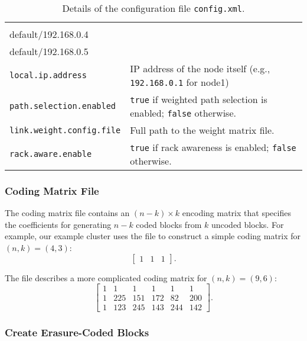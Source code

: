 \documentclass[letterpaper,12pt]{article}
\begin{document}
\begin{table}[!ht]
\begin{tabular}{|p{2in}|p{4.2in}|}
{default/192.168.0.3\\
default/192.168.0.4\\
default/192.168.0.5}
\smallskip\\
\hline
{\tt local.ip.address} & IP address of the node itself (e.g.,
{\tt 192.168.0.1} for node1)\\
\hline
{\tt path.selection.enabled} & {\tt true} if weighted path selection is
enabled; {\tt false} otherwise.\\
\hline
{\tt link.weight.config.file} & Full path to the weight matrix file. \\
\hline
{\tt rack.aware.enable} & {\tt true} if rack awareness is enabled;
{\tt false} otherwise. \\
\hline
\end{tabular}
\caption{Details of the configuration file {\tt config.xml}.}
\label{tab:config}
\end{table}

\subsubsection{Coding Matrix File}
\label{subsubsec:matrix}

The coding matrix file contains an $(n-k) \times k$ encoding matrix that
specifies the coefficients for generating $n-k$ coded blocks from $k$ uncoded
blocks.  For example, our example cluster uses the file
 to construct a simple coding matrix for
$(n,k)=(4,3)$:
\[
\begin{bmatrix}
1 & 1 & 1
\end{bmatrix}.
\]

The file  describes a more complicated
coding matrix for $(n,k)=(9,6)$:
\[
\begin{bmatrix}
1 &   1 &    1 &    1 &    1 &    1 \\
1 &    225 &  151 &  172 &  82 &   200 \\
1 &   123 &  245 &  143 &  244 &  142
\end{bmatrix}.
\]

\subsubsection{Create Erasure-Coded Blocks}
\end{document}
